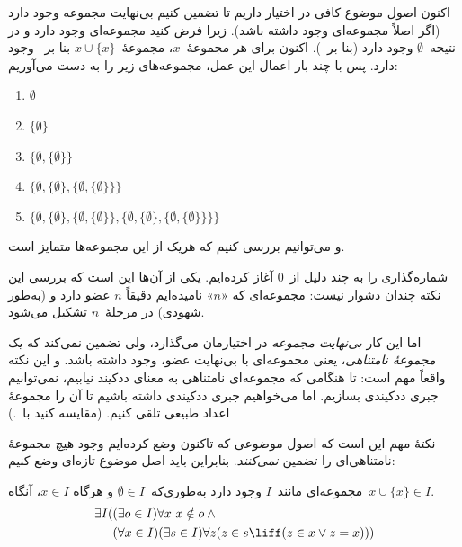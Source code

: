 \documentclass[../../../include/open-logic-section]{subfiles}
\begin{document}

اکنون اصول موضوع کافی در اختیار داریم تا تضمین کنیم بی‌نهایت مجموعه وجود
دارد (اگر اصلاً مجموعه‌ای وجود داشته باشد). زیرا فرض کنید مجموعه‌ای وجود
دارد و در نتیجه~$\emptyset$ وجود دارد (بنا
بر~). اکنون برای هر مجموعهٔ~$x$،
مجموعهٔ~$x \cup \{x\}$ بنا
بر~ وجود دارد. پس با چند بار
اعمال این عمل، مجموعه‌های زیر را به دست می‌آوریم:
\begin{enumerate}
	\item[0.] $\emptyset$ %
	\item[1.] $ \{\emptyset\}$ %
	\item[2.] $\{\emptyset, \{\emptyset\}\}$ %
	\item[3.] $\{\emptyset, \{\emptyset\}, \{\emptyset, \{\emptyset\}\}\}$ %
	\item[4.] $\{\emptyset, \{\emptyset\}, \{\emptyset, \{\emptyset\}\}, \{\emptyset, \{\emptyset\}, \{\emptyset, \{\emptyset\}\}\}\}$%
\end{enumerate}
و می‌توانیم بررسی کنیم که هریک از این مجموعه‌ها متمایز است.

شماره‌گذاری را به چند دلیل از~$0$ آغاز کرده‌ایم. یکی از آن‌ها این است که
بررسی این نکته چندان دشوار نیست: مجموعه‌ای که «$n$» نامیده‌ایم دقیقاً
$n$ عضو دارد و (به‌طور شهودی) در مرحلهٔ~$n$ تشکیل می‌شود.

اما این کار \emph{بی‌نهایت مجموعه} در اختیارمان می‌گذارد، ولی تضمین
نمی‌کند که یک \emph{مجموعهٔ نامتناهی}، یعنی مجموعه‌ای با بی‌نهایت عضو،
وجود داشته باشد. و این نکته واقعاً مهم است: تا هنگامی که مجموعه‌ای
نامتناهی به معنای ددکیند نیابیم، نمی‌توانیم جبری ددکیندی بسازیم. اما
می‌خواهیم جبری ددکیندی داشته باشیم تا آن را مجموعهٔ اعداد طبیعی تلقی کنیم.
(مقایسه کنید با~.)

نکتهٔ مهم این است که اصول موضوعی که تاکنون وضع کرده‌ایم وجود هیچ مجموعهٔ
نامتناهی‌ای را تضمین \emph{نمی‌کنند}. بنابراین باید اصل موضوع تازه‌ای وضع
کنیم:

\begin{axiom}[نامتناهی]
مجموعه‌ای مانند~$I$ وجود دارد به‌طوری‌که~$\emptyset \in I$ و هرگاه
$x \in I$، آنگاه~$x \cup \{x\} \in I$.
\begin{align*}
	\exists I( & (\exists o \in I)\forall x\ x \notin o \land {}\\
	& (\forall x \in I)(\exists s \in I)\forall z(z \in s \liff (z \in x \lor z = x)))
\end{align*}
\end{axiom}
\end{document}
